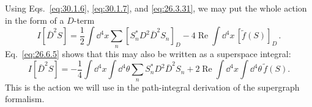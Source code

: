Using Eqs.~\eqref{eq:30.1.6}, \eqref{eq:30.1.7}, and
\eqref{eq:26.3.31}, we may put the whole action in the form of a \(D\)-term
\begin{equation}
  I[\bar D^2S]
  =\frac12\int \dd^4x\sum_n
    [S_n^*D^2\bar D^2S_n]_D
   -4\operatorname{Re}\int \dd^4x\,[\widetilde f(S)]_D\,.
  \tag{30.1.8}\label{eq:30.1.8}
\end{equation}
Eq.~\eqref{eq:26.6.5} shows that this may also be written as a superspace
integral:
\begin{equation}
  I[\bar D^2S]
  =-\frac14\int \dd^4x\int \dd^4\theta
    \sum_nS_n^*D^2\bar D^2S_n
   +2\operatorname{Re}\int \dd^4x\int \dd^4\theta\,\widetilde f(S).
  \tag{30.1.9}\label{eq:30.1.9}
\end{equation}
This is the action we will use in the path-integral derivation of the
supergraph formalism.
